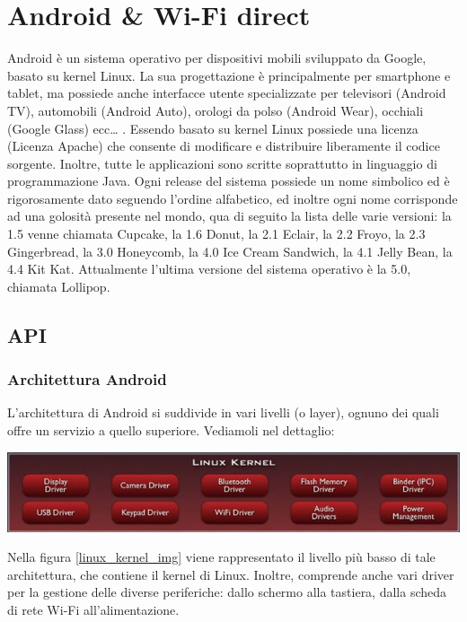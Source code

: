 \chapter{Android & Wi-Fi direct}

Android è un sistema operativo per dispositivi mobili sviluppato da Google, basato su kernel Linux.
La sua progettazione è principalmente per smartphone e tablet, ma possiede anche interfacce utente specializzate per televisori (Android TV), automobili (Android  Auto), orologi da polso (Android Wear), occhiali (Google Glass) ecc… .
Essendo basato su kernel Linux possiede una licenza (Licenza Apache) che consente di modificare e distribuire liberamente il codice sorgente. 
Inoltre, tutte le applicazioni sono scritte soprattutto in linguaggio di programmazione Java.
Ogni release del sistema possiede un nome simbolico ed è rigorosamente dato seguendo l'ordine alfabetico, ed inoltre ogni nome corrisponde ad una golosità presente nel mondo, qua di seguito la lista delle varie versioni: la 1.5 venne chiamata Cupcake, la 1.6 Donut, la 2.1 Eclair, la 2.2 Froyo, la 2.3 Gingerbread, la 3.0 Honeycomb, la 4.0 Ice Cream Sandwich, la 4.1 Jelly Bean, la 4.4 Kit Kat. 
Attualmente l’ultima versione del sistema operativo è la 5.0, chiamata Lollipop.


\section{API}

\subsection{Architettura Android}

L'architettura di Android si suddivide in vari livelli (o layer), ognuno dei quali offre un servizio a quello superiore.
Vediamoli nel dettaglio:

\begin{center}
\includegraphics[width=1\textwidth]{imgs/Linux Kernel.jpg}
\label{linux_kernel_img}%
\end{center}

Nella figura \ref{linux_kernel_img} viene rappresentato il livello più basso di tale architettura, che contiene il kernel di Linux.
Inoltre, comprende anche vari driver per la gestione delle diverse periferiche: dallo schermo alla tastiera, dalla scheda di rete Wi-Fi all'alimentazione.

